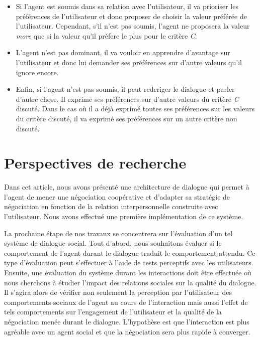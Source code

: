 \documentclass [french]{sig-alternate-05-2015}
\begin{document}
 \begin{itemize}
 	\item Si l'agent est soumis dans sa relation avec l'utilisateur, il va prioriser les préférences de l'utilisateur et donc proposer de choisir la valeur préférée de l'utilisateur. Cependant, s'il n'est pas soumis, l'agent ne proposera la valeur \textit{more} que si la valeur qu'il prèfere le plus pour le critère \emph{C}.
 	\item L'agent n'est pas dominant, il va vouloir en apprendre d'avantage sur l'utilisateur et donc lui demander ses préférences sur d'autre valeurs qu'il ignore encore.
 	\item Enfin, si l'agent n'est pas soumis, il peut rederiger le dialogue et parler d'autre chose. Il exprime ses préférences sur d'autre valeurs du critère \emph{C} discuté. Dans le cas où il a déjà exprimé toutes ses préférences sur les valeurs du critère discuté, il va exprimé ses préférences sur un autre critère non discuté.
 \end{itemize}
\section{Perspectives de recherche}
\label{conc}
Dans cet article, nous avons présenté une architecture de dialogue qui permet à l'agent de mener une négociation coopérative et d'adapter sa stratégie de négociation en fonction de la relation interpersonnelle construite avec l'utilisateur. Nous avons effectué une première implémentation de ce système. 

\par La prochaine étape de nos travaux se concentrera sur l'évaluation d'un tel système de dialogue social. Tout d'abord, nous souhaitons évaluer si le comportement de l'agent durant le dialogue traduit le comportement attendu. Ce type d'évaluation peut s'effectuer à l'aide de tests perceptifs avec les utilisateurs. 
Ensuite, une évaluation du système durant les interactions doit être effectuée où nous cherchons à étudier l'impact des relations sociales sur la qualité du dialogue. Il s'agira alors de vérifier non seulement la perception par l'utilisateur des comportements sociaux de l'agent au cours de l'interaction mais aussi l'effet de tels comportements sur l'engagement de l'utilisateur et la qualité de la négociation menée durant le dialogue. L'hypothèse est que l'interaction est plus agréable avec un agent social et que la négociation sera plus rapide à converger.
\end{document}
